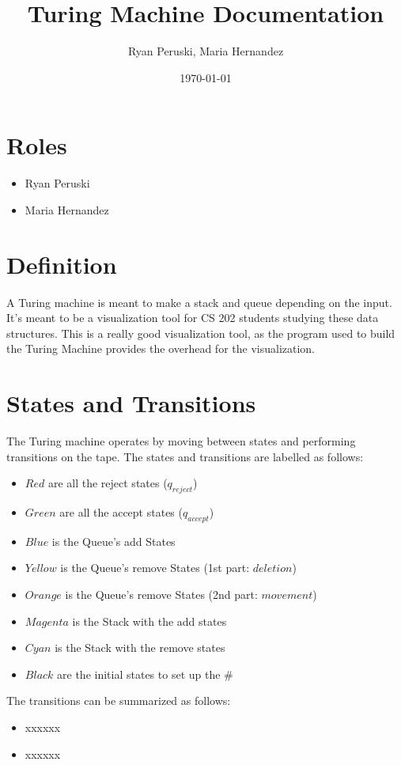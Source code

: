 \documentclass{article}
\title{Turing Machine Documentation}
\author{Ryan Peruski, Maria Hernandez}
\date{\today}
\begin{document}
\maketitle
\section{Roles}

\begin{itemize}
    \item Ryan Peruski
    \item Maria Hernandez
\end{itemize}
\section{Definition}
A Turing machine is meant to make a stack and queue depending on the input. It's meant to be a visualization tool for CS 202 students
studying these data structures. This is a really good visualization tool, as the program used to build the Turing Machine provides the overhead for
the visualization.

\section{States and Transitions}
The Turing machine operates by moving between states and performing transitions on the tape. The states and transitions are labelled as follows:

\begin{itemize}
    \item $Red$ are all the reject states ($q_{reject}$)
    \item $Green$ are all the accept states ($q_{accept}$)
    \item $Blue$ is the Queue's add States
    \item $Yellow$ is the Queue's remove States (1st part: $deletion$)
    \item $Orange$ is the Queue's remove States  (2nd part: $movement$)
    \item $Magenta$ is the Stack with the add states
    \item $Cyan$ is the Stack with the remove states
    \item $Black$ are the initial states to set up the $\#$
\end{itemize}

The transitions can be summarized as follows:
\begin{itemize}
    \item xxxxxx
    \item xxxxxx
\end{itemize}
\end{document}
